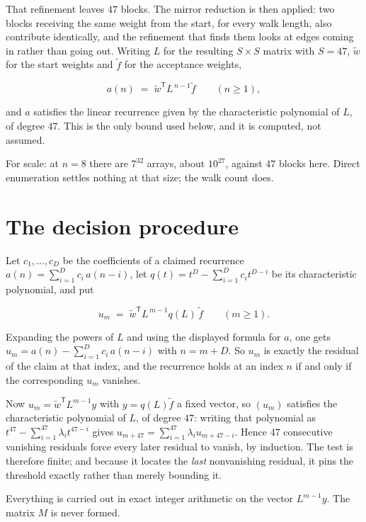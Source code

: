 \documentclass[11pt]{article}
\theoremstyle{definition}
\begin{document}
That refinement leaves $47$ blocks. The mirror reduction is then applied: two blocks receiving the same weight from the start, for every walk length, also contribute identically, and the refinement that finds them looks at edges coming in rather than going out. Writing $L$ for the resulting $S \times S$ matrix with $S = 47$, $\tilde w$ for the start weights and $\tilde f$ for the acceptance weights,

\[a(n) \;=\; \tilde w^{\mathsf T} L^{\,n-1} \tilde f \qquad (n \ge 1),\]

and $a$ satisfies the linear recurrence given by the characteristic polynomial of $L$, of degree $47$. This is the only bound used below, and it is computed, not assumed.

For scale: at $n = 8$ there are $7^{32}$ arrays, about $10^{27}$, against $47$ blocks here. Direct enumeration settles nothing at that size; the walk count does.

\section{The decision procedure}

Let $c_1,\dots,c_D$ be the coefficients of a claimed recurrence $a(n) = \sum_{i=1}^{D} c_i\,a(n-i)$, let $q(t) = t^{D} - \sum_{i=1}^{D} c_i t^{D-i}$ be its characteristic polynomial, and put

\[u_m \;=\; \tilde w^{\mathsf T} L^{\,m-1} q(L)\,\tilde f \qquad (m \ge 1).\]

Expanding the powers of $L$ and using the displayed formula for $a$, one gets $u_m = a(n) - \sum_{i=1}^{D} c_i\,a(n-i)$ with $n = m + D$. So $u_m$ is exactly the residual of the claim at that index, and the recurrence holds at an index $n$ if and only if the corresponding $u_m$ vanishes.

Now $u_m = \tilde w^{\mathsf T} L^{m-1} y$ with $y = q(L)\tilde f$ a fixed vector, so $(u_m)$ satisfies the characteristic polynomial of $L$, of degree $47$: writing that polynomial as $t^{47} - \sum_{i=1}^{47} \lambda_i t^{47-i}$ gives $u_{m+47} = \sum_{i=1}^{47} \lambda_i u_{m+47-i}$. Hence $47$ consecutive vanishing residuals force every later residual to vanish, by induction. The test is therefore finite; and because it locates the {\itshape last} nonvanishing residual, it pins the threshold exactly rather than merely bounding it.

Everything is carried out in exact integer arithmetic on the vector $L^{m-1}y$. The matrix $M$ is never formed.
\end{document}
